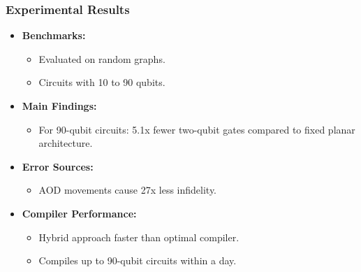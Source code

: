 \documentclass[18 pt]{beamer}
\begin{document}
\begin{frame}
    \frametitle{Experimental Results}
    \begin{itemize}
        \item \textbf{Benchmarks:}
        \begin{itemize}
            \item Evaluated on random graphs.
            \item Circuits with 10 to 90 qubits.
        \end{itemize}
        \item \textbf{Main Findings:}
        \begin{itemize}
            \item For 90-qubit circuits: 5.1x fewer two-qubit gates compared to fixed planar architecture.
        \end{itemize}
        \item \textbf{Error Sources:}
        \begin{itemize}
            \item AOD movements cause 27x less infidelity.
        \end{itemize}
        \item \textbf{Compiler Performance:}
        \begin{itemize}
            \item Hybrid approach faster than optimal compiler.
            \item Compiles up to 90-qubit circuits within a day.
        \end{itemize}
    \end{itemize}
\end{frame}
\end{document}
